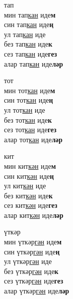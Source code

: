 \begin{multicols}{4}
\begin{enumerate}
\begin{minipage}{\linewidth}
    \item
    тап\\
    мин тап\underline{кан} иде\textbf{м}\\
    син тап\underline{кан} иде\textbf{ң}\\
    ул тап\underline{кан} иде\\
    без тап\underline{кан} иде\textbf{к}\\
    сез тап\underline{кан} иде\textbf{гез}\\
    алар тап\underline{кан} иде\textbf{ләр}\\
\end{minipage}

\begin{minipage}{\linewidth}
    \item
    тот\\
    мин тот\underline{кан} иде\textbf{м}\\
    син тот\underline{кан} иде\textbf{ң}\\
    ул тот\underline{кан} иде\\
    без тот\underline{кан} иде\textbf{к}\\
    сез тот\underline{кан} иде\textbf{гез}\\
    алар тот\underline{кан} иде\textbf{ләр}\\
\end{minipage}

\begin{minipage}{\linewidth}
    \item
    кит\\
    мин кит\underline{кән} иде\textbf{м}\\
    син кит\underline{кән} иде\textbf{ң}\\
    ул кит\underline{кән} иде\\
    без кит\underline{кән} иде\textbf{к}\\
    сез кит\underline{кән} иде\textbf{гез}\\
    алар кит\underline{кән} иде\textbf{ләр}\\
\end{minipage}

\begin{minipage}{\linewidth}
    \item
    үткәр\\
    мин үткәр\underline{гән} иде\textbf{м}\\
    син үткәр\underline{гән} иде\textbf{ң}\\
    ул үткәр\underline{гән} иде\\
    без үткәр\underline{гән} иде\textbf{к}\\
    сез үткәр\underline{гән} иде\textbf{гез}\\
    алар үткәр\underline{гән} иде\textbf{ләр}\\
\end{minipage}


\end{enumerate}
\end{multicols}
